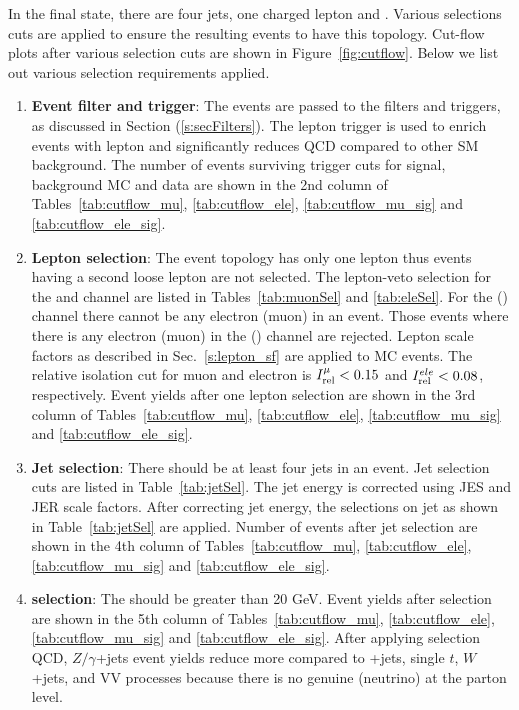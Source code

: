 
In the final state, there are four jets, one charged lepton and \MET.
Various selections cuts are applied to ensure the resulting events to have 
this topology. Cut-flow plots after various selection cuts are shown in 
Figure~\ref{fig:cutflow}. Below we list out various selection requirements applied.
\begin{enumerate}
\item{\bf{Event filter and trigger}}:
    The events are passed to the filters and triggers, as discussed in 
    Section (\ref{s:secFilters}). The lepton trigger is used to enrich events 
    with lepton and significantly reduces QCD compared to other SM background.
    The number of events surviving trigger cuts for signal, background MC and 
    data are shown in the 2nd column of Tables~\ref{tab:cutflow_mu}, 
    \ref{tab:cutflow_ele}, \ref{tab:cutflow_mu_sig} and \ref{tab:cutflow_ele_sig}. 
\item {\bf{Lepton selection}}:
The event topology has only one lepton thus events having a second loose lepton 
are not selected. The lepton-veto selection for the \mujets and \ejets
channel are listed in Tables~\ref{tab:muonSel} and \ref{tab:eleSel}.
For the \mujets (\ejets) channel there cannot be any electron (muon) 
in an event. Those events where there is any electron (muon) in the \mujets (\ejets) channel are rejected. Lepton scale factors as described in Sec.~\ref{s:lepton_sf} are applied to MC events. The relative isolation cut for 
muon and electron is $I_{\rm rel}^{\mu} < 0.15$ and $I_{\rm rel}^{ele} < 0.08$, respectively. Event yields after one lepton selection are shown in the 3rd 
column of Tables~\ref{tab:cutflow_mu}, \ref{tab:cutflow_ele}, 
\ref{tab:cutflow_mu_sig} and \ref{tab:cutflow_ele_sig}.

\item {\bf{Jet selection}}:
There should be at least four jets in an event.
Jet selection cuts are listed in Table~\ref{tab:jetSel}.
The jet energy is corrected using JES and JER scale factors.
After correcting jet energy, the selections on jet as shown in 
Table~\ref{tab:jetSel} are applied. Number of events after jet selection are 
shown in the 4th column of Tables~\ref{tab:cutflow_mu},
\ref{tab:cutflow_ele}, \ref{tab:cutflow_mu_sig} and \ref{tab:cutflow_ele_sig}.

\item {\bf{\MET selection}}:
The \MET should be greater than 20 GeV. Event yields after \MET selection are 
shown in the 5th column of Tables~\ref{tab:cutflow_mu},
\ref{tab:cutflow_ele}, \ref{tab:cutflow_mu_sig} and \ref{tab:cutflow_ele_sig}.
After applying \MET selection QCD, $Z/\gamma$+jets event yields reduce more compared to \ttbar+jets, single $t$, $W$+jets, and VV processes because 
there is no genuine \MET (neutrino) at the parton level.


\end{enumerate}

